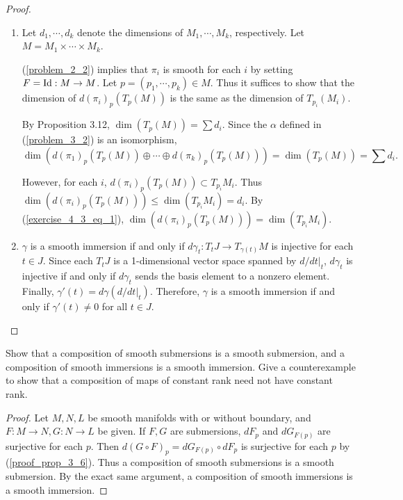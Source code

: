 \begin{proof}
   $ $
  \begin{enumerate}[label=(\alph*)]
    \item
      Let $d_1, \cdots, d_k$ denote the dimensions of $M_1, \cdots, M_k$, respectively.
      Let $M = M_1 \times \cdots \times M_k$.

      (\ref{problem_2_2}) implies that $\pi_i$ is smooth for each $i$ by setting $F = \operatorname{Id}: M \rightarrow M$.
      Let $p = (p_1, \cdots, p_k) \in M$.
      Thus it suffices to show that the dimension of $d(\pi_i)_p(T_p(M))$ is the same as the dimension of $T_{p_i}(M_i)$.

      By Proposition 3.12, $\dim(T_p(M)) = \sum d_i$.
      Since the $\alpha$ defined in (\ref{problem_3_2}) is an isomorphism,
      \begin{equation}\label{exercise_4_3_eq_1}
        \dim(d(\pi_1)_p(T_p(M)) \oplus \cdots \oplus d(\pi_k)_p(T_p(M))) = \dim(T_p(M)) = \sum d_i.
      \end{equation}

      However, for each $i$, $d(\pi_i)_p(T_p(M)) \subset T_{p_i}M_i$.
      Thus $\dim(d(\pi_i)_p(T_p(M))) \leq \dim(T_{p_i}M_i) = d_i$.
      By (\ref{exercise_4_3_eq_1}), $\dim(d(\pi_i)_p(T_p(M))) = \dim(T_{p_i}M_i)$.
    \item
      $\gamma$ is a smooth immersion if and only if $d\gamma_t: T_tJ \rightarrow T_{\gamma(t)}M$ is injective for each $t \in J$.
      Since each $T_tJ$ is a 1-dimensional vector space spanned by $d/dt\vert_t$, $d\gamma_t$ is injective if and only if $d\gamma_t$ sends the basis element to a nonzero element.
      Finally, $\gamma'(t) = d\gamma(d/dt\vert_{t})$.
      Therefore, $\gamma$ is a smooth immersion if and only if $\gamma'(t) \ne 0$ for all $t \in J$.
  \end{enumerate}
\end{proof}

\begin{customexer}{4.4}\label{exercise_4_4}
  Show that a composition of smooth submersions is a smooth submersion, and a composition of smooth immersions is a smooth immersion.
  Give a counterexample to show that a composition of maps of constant rank need not have constant rank.
\end{customexer}

\begin{proof}
  Let $M, N, L$ be smooth manifolds with or without boundary, and $F: M \rightarrow N, G: N \rightarrow L$ be given.
  If $F, G$ are submersions, $dF_p$ and $dG_{F(p)}$ are surjective for each $p$.
  Then $d(G \circ F)_p = dG_{F(p)} \circ dF_p$ is surjective for each $p$ by (\ref{proof_prop_3_6}).
  Thus a composition of smooth submersions is a smooth submersion.
  By the exact same argument, a composition of smooth immersions is a smooth immersion.
\end{proof}

